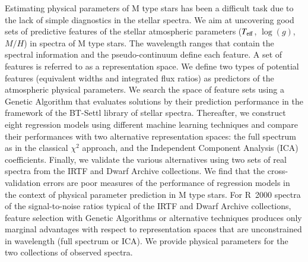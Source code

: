 \documentclass[printer]{aa}
\begin{document}
   \abstract
    {Estimating physical parameters of M type stars has been a
      difficult task due to the lack of simple diagnostics in the
      stellar spectra.}
    {We aim at uncovering good sets of predictive features of the
      stellar atmospheric parameters ($T_{\rm eff}$, $\log(g)$, $M/H$)
      in spectra of M type stars. 
      The wavelength ranges that contain the spectral information and the pseudo-continuum 
      define each feature. A set of features is referred to as a
      representation space.}
    {We define two types of potential features (equivalent widths and
      integrated flux ratios) as predictors of the atmospheric
      physical parameters. We search the space of feature sets using a
      Genetic Algorithm that evaluates solutions by their prediction
      performance in the framework of the BT-Settl library of stellar
      spectra. Thereafter, we construct eight regression models using
      different machine learning techniques and compare their
      performances with two alternative representation spaces: the
      full spectrum as in the classical $\chi^2$ approach, and the
      Independent Component Analysis (ICA) coefficients. Finally, we
      validate the various alternatives using two sets of real spectra
      from the IRTF and Dwarf Archive collections.}
    {We find that the cross-validation errors are poor measures of the
      performance of regression models in the context of physical
      parameter prediction in M type stars. For R~2000 spectra of the
      signal-to-noise ratios typical of the IRTF and Dwarf Archive
      collections, feature selection with Genetic Algorithms or
      alternative techniques produces only marginal advantages with
      respect to representation spaces that are unconstrained in
      wavelength (full spectrum or ICA). We provide physical
      parameters for the two collections of observed spectra.}
    {}


   \maketitle
%
\end{document}
